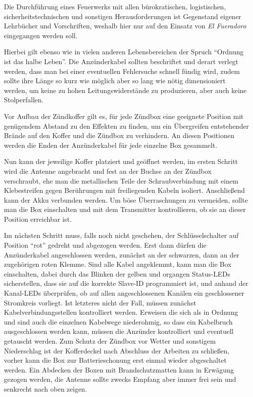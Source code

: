 \documentclass[paper=a4, parskip, numbers=noenddot, toc=listof, headsepline]{scrbook}
\newcommand{\anlage}{\emph{El Fueradoro}}
\begin{document}
			Die Durchführung eines Feuerwerks mit allen bürokratischen, logistischen, sicherheitstechnischen und sonstigen Herausforderungen ist Gegenstand eigener Lehrbücher und Vorschriften, weshalb hier nur auf den Einsatz von {\anlage} eingegangen werden soll.

			Hierbei gilt ebenso wie in vielen anderen Lebensbereichen der Spruch \enquote{Ordnung ist das halbe Leben}. Die Anzünderkabel sollten beschriftet und derart verlegt werden, dass man bei einer eventuellen Fehlersuche schnell fündig wird, zudem sollte ihre Länge so kurz wie möglich aber so lang wie nötig dimensioniert werden, um keine zu hohen Leitungswiderstände zu produzieren, aber auch keine Stolperfallen.

			Vor Aufbau der Zündkoffer gilt es, für jede Zündbox eine geeignete Position mit genügendem Abstand zu den Effekten zu finden, um ein Übergreifen entstehender Brände auf den Koffer und die Zündbox zu verhindern. An diesen Positionen werden die Enden der Anzünderkabel für jede einzelne Box gesammelt.

			Nun kann der jeweilige Koffer platziert und geöffnet werden, im ersten Schritt wird die Antenne angebracht und fest an der Buchse an der Zündbox verschraubt, ehe man die metallischen Teile der Schraubverbindung mit einem Klebestreifen gegen Berührungen mit freiliegenden Kabeln isoliert. Anschließend kann der Akku verbunden werden. Um böse Überraschungen zu vermeiden, sollte man die Box einschalten und mit dem Transmitter kontrollieren, ob sie an dieser Position erreichbar ist.

			Im nächsten Schritt muss, falls noch nicht geschehen, der Schlüsselschalter auf Position \enquote{rot} gedreht und abgezogen werden. Erst dann dürfen die Anzünderkabel angeschlossen werden, zunächst an der schwarzen, dann an der zugehörigen roten Klemme. Sind alle Kabel angeklemmt, kann man die Box einschalten, dabei durch das Blinken der gelben und organgen Status-LEDs sicherstellen, dass sie auf die korrekte Slave-ID programmiert ist, und anhand der Kanal-LEDs überprüfen, ob auf allen angeschlossenen Kanälen ein geschlossener Stromkreis vorliegt. Ist letzteres nicht der Fall, müssen zunächst Kabelverbindungsstellen kontrolliert werden. Erweisen die sich als in Ordnung und sind auch die einzelnen Kabelwege niederohmig, so dass ein Kabelbruch ausgeschlossen werden kann, müssen die Anzünder kontrolliert und eventuell getauscht werden. Zum Schutz der Zündbox vor Wetter und sonstigem Niederschlag ist der Kofferdeckel nach Abschluss der Arbeiten zu schließen, vorher kann die Box zur Batterieschonung erst einmal wieder abgeschaltet werden. Ein Abdecken der Boxen mit Brandschutzmatten kann in Erwägung gezogen werden, die Antenne sollte zwecks Empfang aber immer frei sein und senkrecht nach oben zeigen.
\end{document}
